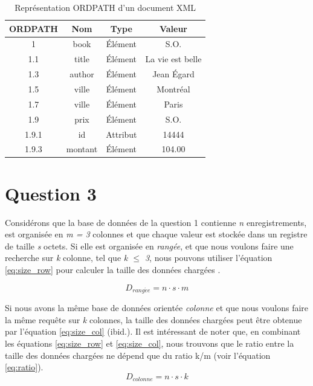 \documentclass{article}
\numberwithin{equation}{section} %
\begin{document}
    \begin{table}[!ht]
        \begin{center}
            \begin{tabular}{|| c | c | c | c ||}
                \hline
                \textbf{ORDPATH} & \textbf{Nom} & \textbf{Type} & \textbf{Valeur} \\
                \hline
                \hline
                1   & book & Élément & S.O.\\
                1.1 & title & Élément & La vie est belle\\
                1.3 & author & Élément & Jean Égard\\
                1.5 & ville & Élément & Montréal\\
                1.7 & ville & Élément & Paris\\
                1.9 & prix & Élément & S.O.\\
                1.9.1 & id & Attribut & 14444\\
                1.9.3 & montant & Élément & 104.00\\
                \hline
            \end{tabular}
        \end{center}
        \caption{Représentation ORDPATH d'un document XML}
        \label{table:ordpath}
    \end{table}
    
\newpage
\section{Question 3}
Considérons que la base de données de la question 1 contienne \textit{n} enregistrements, est organisée en \textit{m = 3} colonnes et que chaque valeur est stockée dans un registre de taille \textit{s} octets. Si elle est organisée en \textit{rangée}, et que nous voulons faire une recherche sur \textit{k} colonne, tel que \textit{k $\leq$ 3}, nous pouvons utiliser l'équation \ref{eq:size_row} pour calculer la taille des données chargées \cite{Lee_2026}.

\begin{equation}
    D_{rang\acute{e}e} = n \cdot s \cdot m
    \label{eq:size_row}
\end{equation}


Si nous avons la même base de données orientée \textit{colonne} et que nous voulons faire la même requête sur \textit{k} colonnes, la taille des données chargées peut être obtenue par l'équation \ref{eq:size_col} (ibid.). Il est intéressant de noter que, en combinant les équations \ref{eq:size_row} et \ref{eq:size_col}, nous trouvons que le ratio entre la taille des données chargées ne dépend que du ratio k/m (voir l'équation \ref{eq:ratio}).
\begin{equation}
    D_{colonne} = n \cdot s \cdot k
    \label{eq:size_col}
\end{equation}
\end{document}
